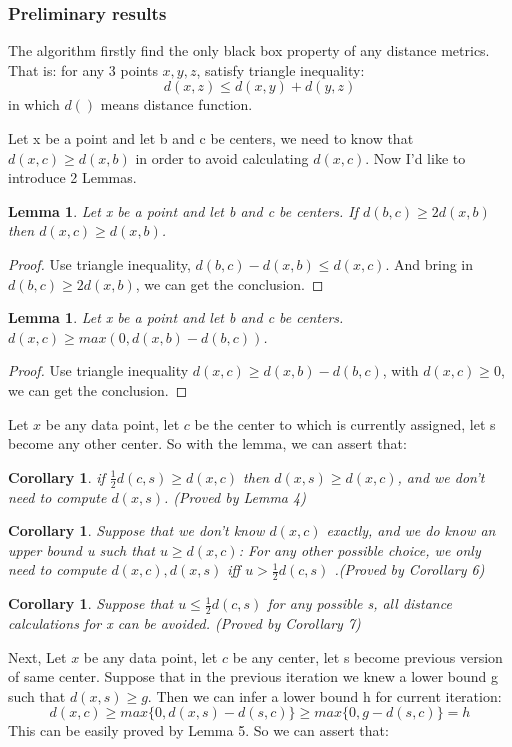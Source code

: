 \documentclass[11pt]{article}
\newtheorem{corollary}[theorem]{Corollary}
\newtheorem{lemma}[theorem]{Lemma}
\begin{document}
\subsubsection{Preliminary results}
The algorithm firstly find the only black box property of any distance metrics. That is: for any 3 points $x, y, z$, satisfy  triangle inequality:
$$d(x,z) \le d(x, y) + d(y, z)$$ in which $d()$ means distance function.\par
Let x be a point and let b and c be centers, we need to know that $d(x, c) \ge d(x, b)$ in order to avoid calculating $d(x, c)$. Now I'd like to introduce 2 Lemmas.
\begin{lemma}
Let x be a point and let b and c be centers. If $d(b, c) \ge 2d(x,b)$ then $d(x,c) \ge d(x,b)$.
\end{lemma}
\begin{proof}
Use triangle inequality, $d(b,c) - d(x,b)\le d(x,c)$. And bring in $d(b, c) \ge 2d(x,b)$, we can get the conclusion.
\end{proof}
\begin{lemma}
Let x be a point and let b and c be centers. $d(x,c) \ge max(0, d(x,b)-d(b,c))$.
\end{lemma}
\begin{proof}
Use triangle inequality $d(x,c) \ge d(x,b)-d(b,c)$, with $d(x,c) \ge 0$, we can get the conclusion.
\end{proof}

Let $x$ be any data point, let $c$ be the center to which is currently assigned, let s become any other center. So with the lemma, we can assert that:
\begin{corollary}
if $\frac{1}{2}d(c, s) \ge d(x,c)$ then $d(x, s) \ge d(x, c)$, and we don't need to compute $d(x,s)$. (Proved by Lemma 4)
\end{corollary}

\begin{corollary}
Suppose that we don't know $d(x,c)$ exactly, and we do know an upper bound u such that $u \ge d(x,c)$: For any other possible choice, we only need to compute $d(x, c), d(x, s)$ iff $u > \frac{1}{2}d(c, s)$ .(Proved by Corollary 6)
\end{corollary}
\begin{corollary}
Suppose that $u \le \frac{1}{2}d(c, s)$ for any possible s, all distance calculations for x can be avoided. (Proved by Corollary 7)
\end{corollary}

Next, Let $x$ be any data point, let $c$ be any center, let s become previous version of same center. Suppose that in the previous iteration we knew a lower bound g such that $d(x, s) \ge g$. Then we can infer a lower bound h for current iteration:
$$
d(x, c) \ge max\{0, d(x,s)-d(s,c)\} \ge max\{0, g-d(s,c)\} = h
$$
This can be easily proved by Lemma 5. So we can assert that:
\end{document}
